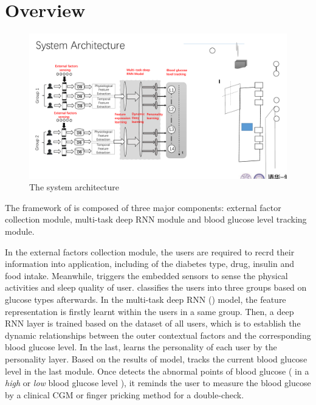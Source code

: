 
\section{Overview}
\label{sec:overview}

\begin{figure}[!t]
  \centering
  \includegraphics[width=1\columnwidth]{./img/System_Arch.pdf}
  \caption{The system architecture}
  \label{fig:architecture}
\end{figure}



The framework of \sysname is composed of three major components: external factor collection module, multi-task deep RNN module and blood glucose level tracking module. 

In the external factors collection module, the users are required to recrd their information into application, including of the diabetes type, drug, insulin and food intake. Meanwhile, \sysname triggers the embedded sensors to sense the physical activities and sleep quality of user.
\sysname classifies the users into three groups based on glucose types afterwards.
In the multi-task deep RNN (\modelname) model, the feature representation is firstly learnt within the users in a same group. Then, a deep RNN layer is trained based on the dataset of all users, which is to establish the dynamic relationships between the outer contextual factors and the corresponding blood glucose level. In the last, \modelname learns the personality of each user by the personality layer.
Based on the results of \modelname model, \sysname tracks the current blood glucose level in the last module. Once \sysname detects the abnormal points of blood glucose ( \ie in a \emph{high} or \emph{low} blood glucose level ), it reminds the user to measure the blood glucose by a clinical CGM or finger pricking method for a double-check.






